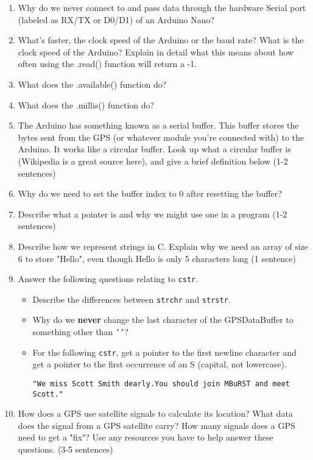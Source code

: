 \begin{enumerate}
		\item Why do we never connect to and pass data through the hardware Serial port (labeled as RX/TX or D0/D1) of an Arduino Nano?
        
		\item What's faster, the clock speed of the Arduino or the baud rate? What is the clock speed of the Arduino? Explain in detail what this means about how often using the .read() function will return a -1. 
        
		\item What does the .available() function do?
		
		\item What does the .millis() function do?
		
    	\item The Arduino has something known as a serial buffer. This buffer stores the bytes sent from the GPS (or whatever module you're connected with) to the Arduino. It works like a circular buffer. Look up what a circular buffer is (Wikipedia is a great source here), and give a brief definition below (1-2 sentences)
    	
        \item Why do we need to set the buffer index to 0 after resetting the buffer?
        
        \item Describe what a pointer is and why we might use one in a program (1-2 sentences)
        
        \item Describe how we represent strings in C. Explain why we need an array of size 6 to store "Hello", even though Hello is only 5 characters long (1 sentence)
        
        \item Answer the following questions relating to \texttt{cstr}.
        \begin{itemize}
            \item Describe the differences between \texttt{strchr} and \texttt{strstr}.
            \item Why do we \textbf{never} change the last character of the GPSDataBuffer to something other than \texttt{'\0'}?
            \item For the following \texttt{cstr}, get a pointer to the first newline character and get a pointer to the first occurrence of an S (capital, not lowercase). 
            
            \texttt{"We miss Scott Smith dearly.\n You should join MBuRST and meet Scott.\n"}
        \end{itemize}
        
        \item How does a GPS use satellite signals to calculate its location? What data does the signal from a GPS satellite carry? How many signals does a GPS need to get a "fix"? Use any resources you have to help answer these questions. (3-5 sentences)
        
	\end{enumerate}
    

